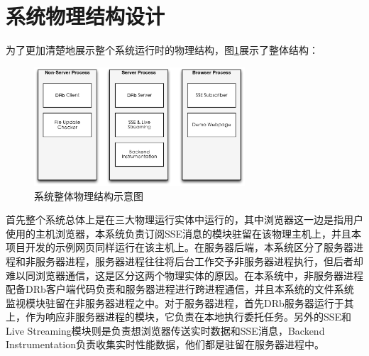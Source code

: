 \section{系统物理结构设计}
为了更加清楚地展示整个系统运行时的物理结构，图\ref{fig-physic}展示了整体结构：

\begin{figure}[h]
\centering
\includegraphics[width=0.7\textwidth]{images/overview/physic_logic.eps}
\caption{系统整体物理结构示意图}
\label{fig-physic}
\end{figure}

首先整个系统总体上是在三大物理运行实体中运行的，其中浏览器这一边是指用户使用的主机浏览器，本系统负责订阅SSE消息的模块驻留在该物理主机上，并且本项目开发的示例网页同样运行在该主机上。在服务器后端，本系统区分了服务器进程和非服务器进程，服务器进程往往将后台工作交予非服务器进程执行，但后者却难以同浏览器通信，这是区分这两个物理实体的原因。在本系统中，非服务器进程配备DRb客户端代码负责和服务器进程进行跨进程通信，并且本系统的文件系统监视模块驻留在非服务器进程之中。对于服务器进程，首先DRb服务器运行于其上，作为响应非服务器进程的模块，它负责在本地执行委托任务。另外的SSE和Live Streaming模块则是负责想浏览器传送实时数据和SSE消息，Backend Instrumentation负责收集实时性能数据，他们都是驻留在服务器进程中。










